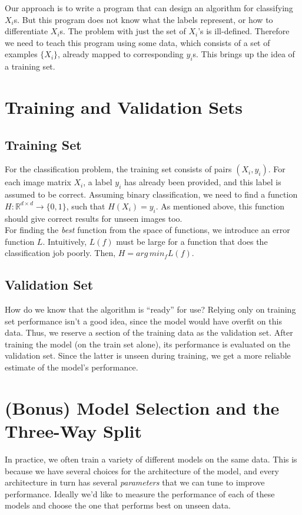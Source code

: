 \documentclass[12pt]{article}
\begin{document}
\noindent Our approach is to write a program that can design an algorithm for classifying $X_i$s. But this program does not know what the labels represent, or how to differentiate $X_i$s. The problem with just the set of $X_i$'s is ill-defined. Therefore we need to teach this program using some data, which consists of a set of examples $\{X_i\}$, already mapped to corresponding $y_i$s. This brings up the idea of a training set.

\section{Training and Validation Sets}


\subsection{Training Set}
For the classification problem, the training set consists of pairs $(X_i,y_i)$. For each image matrix $X_i$, a label $y_i$ has already been provided, and this label is assumed to be correct. Assuming binary classification, we need to find a function $H : \mathbb{R}^{d\times d} \to \{0,1\}$, such that $H(X_i)=y_i$. As mentioned above, this function should give correct results for unseen images too.
\\

\noindent For finding the {\it best} function from the space of functions, we introduce an error function $L$. Intuitively, $L(f)$ must be large for a function that does the classification job poorly. Then, $H = arg\,min_f L(f)$.

\subsection{Validation Set}
How do we know that the algorithm is ``ready'' for use? Relying only on training set performance isn't a good idea, since the model would have overfit on this data. Thus, we reserve a section of the training data as the validation set. After training the model (on the train set alone), its performance is evaluated on the validation set. Since the latter is unseen during training, we get a more reliable estimate of the model's performance.


\section{(Bonus) Model Selection and the Three-Way Split}
\noindent
In practice, we often train a variety of different models on the same data. This is because we have several choices for the architecture of the model, and every architecture in turn has several \textit{parameters} that we can tune to improve performance. Ideally we'd like to measure the performance of each of these models and choose the one that performs best on unseen data. 
\\
\end{document}
